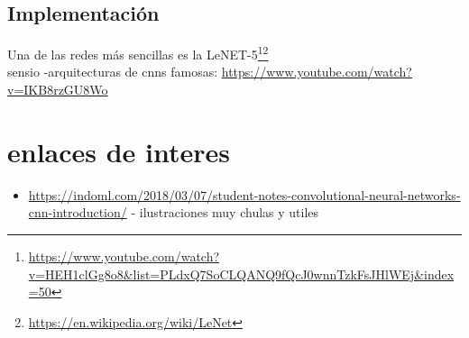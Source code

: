 \documentclass{article}
\begin{document}
\subsection{Implementación}
Una de las redes más sencillas es la LeNET-5\footnote{\url{https://www.youtube.com/watch?v=HEH1clGg8o8&list=PLdxQ7SoCLQANQ9fQcJ0wnnTzkFsJHlWEj&index=50}}\footnote{\url{https://en.wikipedia.org/wiki/LeNet}}\\

sensio -arquitecturas de cnns famosas: \url{https://www.youtube.com/watch?v=IKB8rzGU8Wo}

\section{enlaces de interes}
\begin{itemize}
\item \url{https://indoml.com/2018/03/07/student-notes-convolutional-neural-networks-cnn-introduction/} - ilustraciones muy chulas y utiles


\end{itemize}
\end{document}
